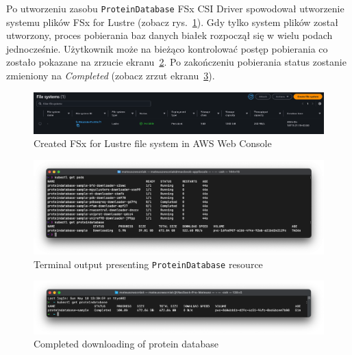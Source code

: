 Po utworzeniu zasobu \texttt{ProteinDatabase} FSx CSI Driver spowodował utworzenie systemu plików FSx for Lustre (zobacz rys.~\ref{fig:fsx_fs}).
Gdy tylko system plików został utworzony, proces pobierania baz danych białek rozpoczął się w wielu podach jednocześnie.
Użytkownik może na bieżąco kontrolować postęp pobierania co zostało pokazane na zrzucie ekranu~\ref{fig:used_proteindatabase_terminal}.
Po zakończeniu pobierania status zostanie zmieniony na \textit{Completed} (zobacz zrzut ekranu~\ref{fig:proteindatabase_completed_terminal}).

\begin{figure}[htbp]
    \centering
    \includegraphics[width=\textwidth]{images/fsx_fs}
    \caption{Created FSx for Lustre file system in AWS Web Console}
    \label{fig:fsx_fs}
\end{figure}

\begin{figure}[htbp]
    \centering
    \includegraphics[width=\textwidth]{images/old_proteindatabase_terminal}
    \caption{Terminal output presenting \texttt{ProteinDatabase} resource}
    \label{fig:used_proteindatabase_terminal}
\end{figure}

\begin{figure}[htbp]
    \centering
    \includegraphics[width=\textwidth]{images/proteindatabase_completed_terminal}
    \caption{Completed downloading of protein database}
    \label{fig:proteindatabase_completed_terminal}
\end{figure}

